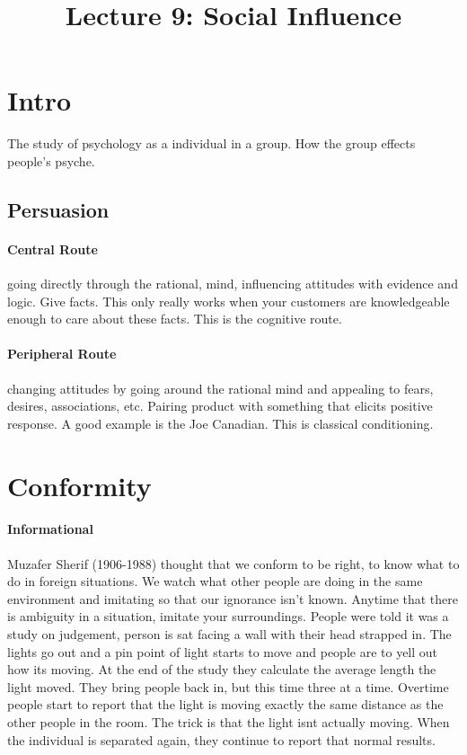 \documentclass{article}
\title{Lecture 9: Social Influence}
\begin{document}
\section*{Intro}
The study of psychology as a individual in a group. How the group effects people's psyche.
\subsection*{Persuasion}
\paragraph*{Central Route} going directly through the rational, mind, influencing attitudes with evidence and logic. Give facts. This only really works when your customers are knowledgeable enough to care about these facts. This is the cognitive route.
\paragraph*{Peripheral Route} changing attitudes by going around the rational mind and appealing to fears, desires, associations, etc. Pairing product with something that elicits positive response. A good example is the Joe Canadian. This is classical conditioning.
\section*{Conformity}
\paragraph*{Informational}Muzafer Sherif (1906-1988) thought that we conform to be right, to know what to do in foreign situations. We watch what other people are doing in the same environment and imitating so that our ignorance isn’t known. Anytime that there is ambiguity in a situation, imitate your surroundings. People were told it was a study on judgement, person is sat facing a wall with their head strapped in. The lights go out and a pin point of light starts to move and people are to yell out how its moving. At the end of the study they calculate the average length the light moved. They bring people back in, but this time three at a time. Overtime people start to report that the light is moving exactly the same distance as the other people in the room. The trick is that the light isnt actually moving. When the individual is separated again, they continue to report that normal results.
\end{document}
